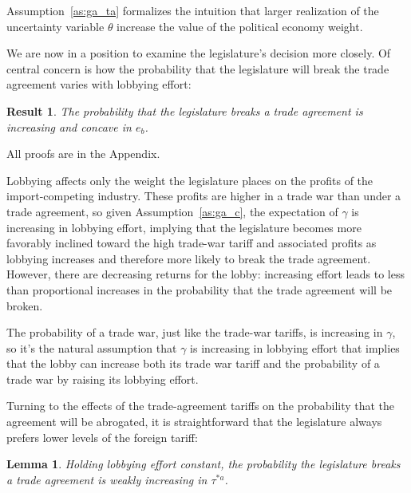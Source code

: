 \documentclass[10pt]{article}
\newtheorem{lemma}{Lemma}
\newtheorem{result}{Result}
\newcommand{\ta}{\theta}
\newcommand{\ga}{\gamma}
\begin{document}
Assumption~\ref{as:ga_ta} formalizes the intuition that larger realization of the uncertainty variable $\ta$ increase the value of the political economy weight.


We are now in a position to examine the legislature's decision more closely. Of central concern is how the probability that the legislature will break the trade agreement varies with lobbying effort: 

\begin{result}
  The probability that the legislature breaks a trade agreement is increasing and concave in $e_b$.
  \label{res:bincC}
\end{result}

\noindent All proofs are in the Appendix. 

Lobbying affects only the weight the legislature places on the profits of the import-competing industry. These profits are higher in a trade war than under a trade agreement, so given Assumption~\ref{as:ga_c}, the expectation of $\ga$ is increasing in lobbying effort, implying that the legislature becomes more favorably inclined toward the high trade-war tariff and associated profits as lobbying increases and therefore more likely to break the trade agreement. However, there are decreasing returns for the lobby: increasing effort leads to less than proportional increases in the probability that the trade agreement will be broken.

The probability of a trade war, just like the trade-war tariffs, is increasing in $\ga$, so it's the natural assumption that $\ga$ is increasing in lobbying effort that implies that the lobby can increase both its trade war tariff and the probability of a trade war by raising its lobbying effort.

Turning to the effects of the trade-agreement tariffs on the probability that the agreement will be abrogated, it is straightforward that the legislature always prefers lower levels of the foreign tariff:
\begin{lemma}
  Holding lobbying effort constant, the probability the legislature breaks a trade agreement is weakly increasing in $\tau^{*a}$.
  \label{lem:leg_astar}
\end{lemma}
\end{document}
